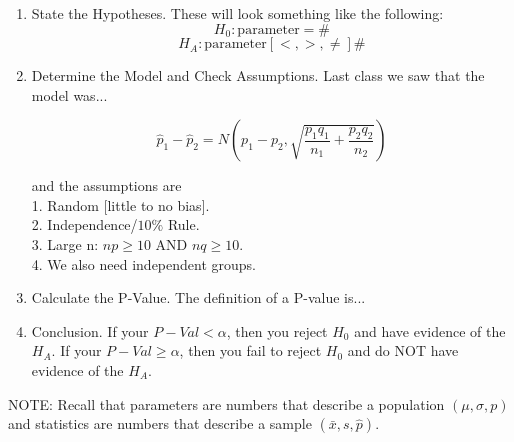 \documentclass[12pt]{amsart}
\theoremstyle{definition}
\begin{document}
 \begin{framed}
 \begin{enumerate}
	\item State the Hypotheses. These will look something like the following: $$H_0:\text{parameter}=\#$$ $$H_A:\text{parameter} [<,>,\neq]\#$$
	\item Determine the Model and Check Assumptions. Last class we saw that the model was... 

	$$\hat{p}_1-\hat{p}_2=N\left( p_1-p_2, \sqrt{\frac{p_1q_1}{n_1}+\frac{p_2q_2}{n_2}}\right)$$
	
	and the assumptions are \\
	1. Random [little to no bias].\\
	2. Independence/$10\%$ Rule.\\
	3. Large n: $np\geq10$ AND $nq\geq 10$.\\ 
	4. We also need independent groups.\\
	\item Calculate the P-Value. The definition of a P-value is...
	\vspace{0.5in}
	\item Conclusion. If your $P-Val<\alpha$, then you reject $H_0$ and have evidence of the $H_A$. If your $P-Val\geq \alpha$, then you fail to reject $H_0$ and do NOT have evidence of the $H_A$.
\end{enumerate}
\end{framed}
NOTE: Recall that parameters are numbers that describe a population $(\mu,\sigma,p)$ and statistics are numbers that describe a sample $(\bar{x},s,\hat{p})$.\\
\end{document}
